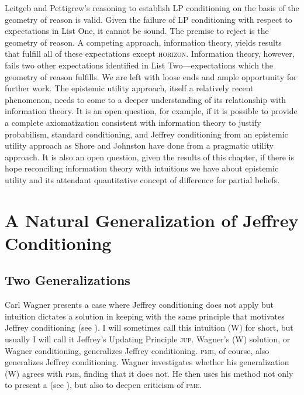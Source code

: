 \documentclass[phd,12pt,oneside]{ubcthesis}
\begin{document}
Leitgeb and Pettigrew's reasoning to establish LP conditioning on the
basis of the geometry of reason is valid. Given the failure of LP
conditioning with respect to expectations in List One, it cannot be
sound. The premise to reject is the geometry of reason. A competing
approach, information theory, yields results that fulfill all of these
expectations except \textsc{horizon}. Information theory, however,
fails two other expectations identified in List Two---expectations
which the geometry of reason fulfills. We are left with loose ends and
ample opportunity for further work. The epistemic utility approach,
itself a relatively recent phenomenon, needs to come to a deeper
understanding of its relationship with information theory. It is an
open question, for example, if it is possible to provide a complete
axiomatization consistent with information theory to justify
probabilism, standard conditioning, and Jeffrey conditioning from an
epistemic utility approach as Shore and Johnston have done from a
pragmatic utility approach. It is also an open question, given the
results of this chapter, if there is hope reconciling information theory
with intuitions we have about epistemic utility and its attendant
quantitative concept of difference for partial beliefs.

\chapter{A Natural Generalization of Jeffrey Conditioning}
\label{chp:eejiegei}

\section{Two Generalizations}
\label{sec:euboonei}


Carl Wagner presents a case where Jeffrey conditioning does not apply
but intuition dictates a solution in keeping with the same principle
that motivates Jeffrey conditioning (see ). I
will sometimes call this intuition (W) for short, but usually I will
call it Jeffrey's Updating Principle \textsc{jup}. Wagner's (W)
solution, or Wagner conditioning, generalizes Jeffrey conditioning.
\textsc{pme}, of course, also generalizes Jeffrey conditioning. Wagner
investigates whether his generalization (W) agrees with \textsc{pme},
finding that it does not. He then uses his method not only to present
a  (see
), but also to deepen criticism of
\textsc{pme}.
\end{document}
